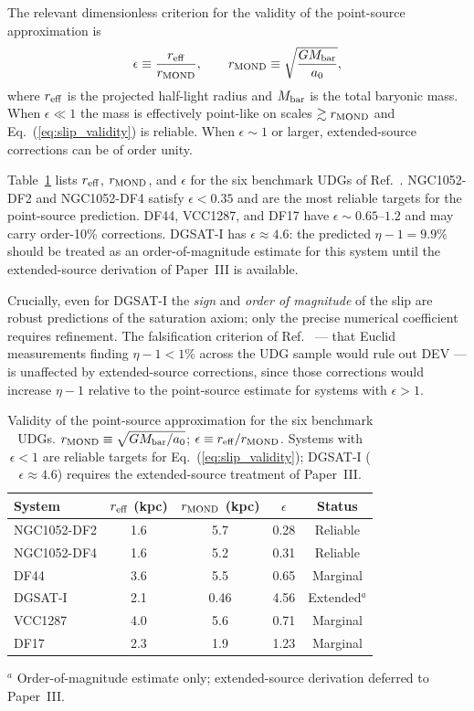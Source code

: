 \documentclass[aps,prd,reprint,floatfix,nofootinbib,superscriptaddress]{revtex4-2}
\newcommand{\aO}{a_0}
\begin{document}
The relevant dimensionless criterion for the validity of the
point-source approximation is
\begin{equation}
  \epsilon \equiv \frac{r_{\rm eff}}{r_{\rm MOND}},
  \qquad
  r_{\rm MOND} \equiv \sqrt{\frac{GM_{\rm bar}}{\aO}},
  \label{eq:epsilon}
\end{equation}
where $r_{\rm eff}$ is the projected half-light radius and
$M_{\rm bar}$ is the total baryonic mass. When $\epsilon \ll 1$
the mass is effectively point-like on scales $\gtrsim r_{\rm MOND}$
and Eq.~(\ref{eq:slip_validity}) is reliable. When $\epsilon \sim 1$
or larger, extended-source corrections can be of order unity.

Table~\ref{tab:validity} lists $r_{\rm eff}$, $r_{\rm MOND}$, and
$\epsilon$ for the six benchmark UDGs of Ref.~\cite{Mendes2026}.
NGC1052-DF2 and NGC1052-DF4 satisfy $\epsilon < 0.35$ and are the
most reliable targets for the point-source prediction. DF44, VCC1287,
and DF17 have $\epsilon \sim 0.65$--$1.2$ and may carry order-10\%
corrections. DGSAT-I has $\epsilon \approx 4.6$: the predicted
$\eta - 1 = 9.9\%$ should be treated as an order-of-magnitude
estimate for this system until the extended-source derivation of
Paper~III is available.

Crucially, even for DGSAT-I the \emph{sign} and \emph{order of
magnitude} of the slip are robust predictions of the saturation
axiom; only the precise numerical coefficient requires refinement.
The falsification criterion of Ref.~\cite{Mendes2026} — that
Euclid measurements finding $\eta - 1 < 1\%$ across the UDG sample
would rule out DEV — is unaffected by extended-source corrections,
since those corrections would increase $\eta - 1$ relative to the
point-source estimate for systems with $\epsilon > 1$.

\begin{table}[h]
\caption{Validity of the point-source approximation for the six
benchmark UDGs. $r_{\rm MOND} \equiv \sqrt{GM_{\rm bar}/\aO}$;
$\epsilon \equiv r_{\rm eff}/r_{\rm MOND}$. Systems with
$\epsilon < 1$ are reliable targets for Eq.~(\ref{eq:slip_validity});
DGSAT-I ($\epsilon \approx 4.6$) requires the extended-source
treatment of Paper~III.}
\label{tab:validity}
\begin{ruledtabular}
\begin{tabular}{lcccc}
System & $r_{\rm eff}$ (kpc) & $r_{\rm MOND}$ (kpc)
       & $\epsilon$ & Status \\
\hline
NGC1052-DF2 & 1.6 & 5.7  & 0.28 & Reliable   \\
NGC1052-DF4 & 1.6 & 5.2  & 0.31 & Reliable   \\
DF44        & 3.6 & 5.5  & 0.65 & Marginal   \\
DGSAT-I     & 2.1 & 0.46 & 4.56 & Extended$^a$ \\
VCC1287     & 4.0 & 5.6  & 0.71 & Marginal   \\
DF17        & 2.3 & 1.9  & 1.23 & Marginal   \\
\end{tabular}
\end{ruledtabular}
{\small $^a$ Order-of-magnitude estimate only; extended-source
derivation deferred to Paper~III.}
\end{table}
\end{document}

